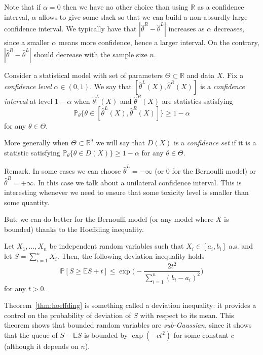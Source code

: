 \documentclass[
	fontsize=11pt, %
	twoside=false, %
	numbers=noenddot, %
]{kaobook}
\renewcommand{\P}{\mathbb P}
\newcommand{\E}{\mathbb E}
\newcommand{\R}{\mathbb R}
\newcommand{\wh}{\widehat}
\begin{document}
Note that if $\alpha = 0$ then we have no other choice than using $\R$ as a confidence interval, $\alpha$ allows to give some slack so that we can build a non-absurdly  large confidence interval. 
We typically have that $|\wh \theta^R - \wh \theta^L|$ increases as $\alpha$ decreases, since a smaller $\alpha$ means more confidence, hence a larger interval.
On the contrary, $|\wh \theta^R - \wh \theta^L|$ should decrease with the sample size $n$.
\begin{definition}
	Consider a statistical model with set of parameters $\Theta \subset \R$ and data $X$. Fix a \emph{confidence level} $\alpha \in (0, 1)$. 
	We say that $[\wh \theta^L(X), \wh \theta^R(X)]$ is a \emph{confidence interval} at level $1 - \alpha$ when $\wh \theta^L(X)$ and $\wh \theta^R(X)$ are statistics satisfying
	\begin{equation*}
		\P_\theta\{ \theta \in [\wh \theta^L(X), \wh \theta^R(X)] \} \geq 1 - \alpha
	\end{equation*}
	for any $\theta \in \Theta$.
\end{definition}
More generally when $\Theta \subset \R^d$ we will say that $D(X)$ is a \emph{confidence set} if it is a statistic satisfying $\P_\theta\{ \theta \in D(X) \} \geq 1 - \alpha$ for any $\theta \in \Theta$.

Remark. In some cases we can choose $\wh \theta^L = -\infty$ (or $0$ for the Bernoulli model) or $\wh \theta^R = +\infty$.
In this case we talk about a unilateral confidence interval.
This is interesting whenever we need to ensure that some toxicity level is smaller than some quantity.

But, we can do better for the Bernoulli model (or any model where $X$ is bounded) thanks to the Hoeffding inequality.
\begin{theorem}
	\label{thm:hoeffding}
	Let $X_1, \ldots, X_n$ be independent random variables such that $X_i \in [a_i, b_i]$ a.s. and let $S = \sum_{i=1}^n X_i$. Then, the following deviation inequality holds
	\begin{equation*}
		\P[ S \geq \E S + t] \leq \exp\Big( - \frac{2 t^2}{\sum_{i=1}^n (b_i - a_i)^2} \Big)
	\end{equation*}
	for any $t >0$.
\end{theorem}
Theorem~\ref{thm:hoeffding} is something called a deviation inequality: it provides a control on the probability of deviation of $S$ with respect to its mean.
This theorem shows that bounded random variables are \emph{sub-Gaussian}, since it shows that the queue of $S - \E S$ is bounded by $\exp(-c t^2)$ for some constant $c$ (although it depends on $n$).
\end{document}
